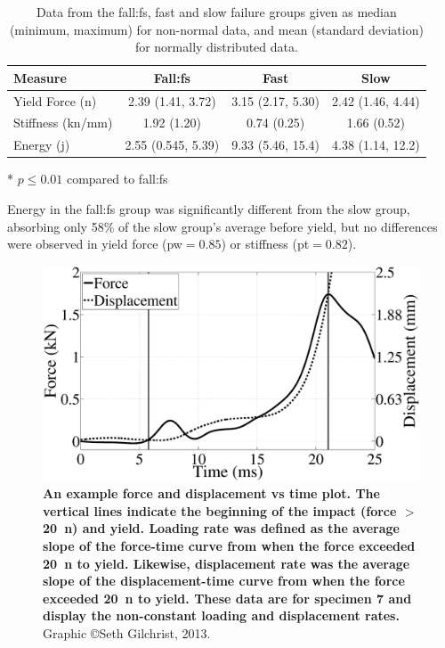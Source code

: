 \begin{table}
\centering
\begin{threeparttable}
\caption[Data for failure groups]{Data from the fall:\ac{fs}, fast and slow failure groups given as median (minimum, maximum) for non-normal data, and mean (standard deviation) for normally distributed data.}
\label{tab:failData}
\begin{tabular}{lccc}
\toprule
Measure 					& Fall:\ac{fs} 			& Fast				& Slow 					\\ \midrule
Yield Force (\ac{n})			 	& 2.39 (1.41, 3.72)	& 3.15 (2.17, 5.30)\tnote{*}	& 2.42 (1.46, 4.44)		\\ 
Stiffness (\ac{kn}/\ac{mm}) 			& 1.92 (1.20) 		& 0.74 (0.25)\tnote{*} 		& 1.66 (0.52)	 		\\ 
Energy (\acs{j}) 					& 2.55 (0.545, 5.39)& 9.33 (5.46, 15.4)\tnote{*}	& 4.38 (1.14, 12.2)\tnote{*}		\\
\bottomrule
\end{tabular}
\begin{tablenotes}
\item[*]{\footnotesize $p \leq 0.01$ compared to fall:\ac{fs}}
\end{tablenotes}
\end{threeparttable}
\end{table}

Energy in the fall:\ac{fs} group was significantly different from the slow group, absorbing only 58\% of the slow group's average before yield, but no differences were observed in yield force (\ac{pw}$ = 0.85$) or stiffness (\ac{pt}$ = 0.82$).

\begin{figure}
\centering
\includegraphics[width=\linewidth]{./behave_fail/Figures/Force_Disp_TimeExp}
\caption[Force and displacement \acs*{vs} time example]{\textbf{An example force and displacement \ac{vs} time plot. The vertical lines indicate the beginning of the impact (force $>$ 20~\ac{n}) and yield. Loading rate was defined as the average slope of the force-time curve from when the force exceeded 20~\ac{n} to yield. Likewise, displacement rate was the average slope of the displacement-time curve from when the force exceeded 20~\ac{n} to yield. These data are for specimen 7 and display the non-constant loading and displacement rates.} Graphic \copyright Seth Gilchrist, 2013.}
\label{fig:Force_Disp_TimeExp}
\end{figure}

